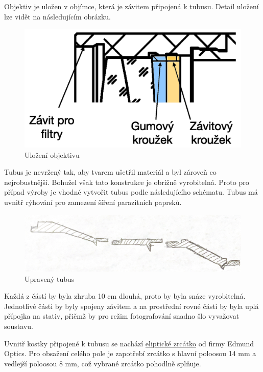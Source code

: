 \documentclass[
]{article}
\begin{document}
Objektiv je uložen v objímce, která je závitem připojená k tubusu.
Detail uložení lze vidět na následujícím obrázku.

\begin{figure}
\centering
\includegraphics{imgs/ulozeni_objektivu.png}
\caption{Uložení objektivu}
\end{figure}

Tubus je nevržený tak, aby tvarem ušetřil materiál a byl zároveň co
nejrobustnější. Bohužel však tato konstrukce je obrížně vyrobitelná.
Proto pro případ výroby je vhodné vytvořit tubus podle následujícího
schématu. Tubus má uvnitř rýhování pro zamezení šíření parazitních paprsků.

\begin{figure}
\centering
\includegraphics{imgs/vylepseny_tubus.png}
\caption{Upravený tubus}
\end{figure}

Každá z částí by byla zhruba 10 cm dlouhá, proto by byla snáze
vyrobitelná. Jednotlivé části by byly spojeny závitem a na prostřední
rovné části by byla uplá přípojka na stativ, přičmž by pro režim
fotografování snadno šlo vyvažovat soustavu.

Uvnitř kostky připojené k tubusu se nachází
\href{https://www.edmundoptics.com/p/elliptical-mirror-2223mm-minor-axis-protected-aluminum/1919/}{eliptické
zrcátko} od firmy Edmund Optics. Pro obsažení celého pole je zapotřebí
zrcátko s hlavní poloosou 14 mm a vedlejší poloosou 8 mm, což vybrané
zrcátko pohodlně splňuje.
\end{document}

